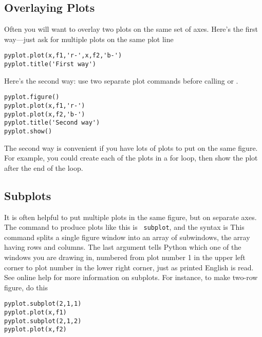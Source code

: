 \subsection*{Overlaying Plots}
  Often you will want to
overlay two plots on the same set of axes.
Here's the first way---just ask for multiple plots on the
same plot line
\begin{Verbatim}
pyplot.plot(x,f1,'r-',x,f2,'b-')
pyplot.title('First way')
\end{Verbatim}
Here's the second way: use two separate plot commands before calling  or .
\begin{Verbatim}
pyplot.figure()
pyplot.plot(x,f1,'r-')
pyplot.plot(x,f2,'b-')
pyplot.title('Second way')
pyplot.show()
\end{Verbatim}
The second way is convenient if you have lots of plots to put on
the same figure.  For example, you could create each of the plots in a for loop, then show the plot after the end of the loop.

\subsection*{Subplots}

It is often helpful to put multiple plots in the same figure, but
on separate axes. The command to produce plots like this is {\tt
subplot}, and the syntax is  This command splits a single figure window into an array
of subwindows, the array having  rows and 
columns. The last argument tells Python which one of the windows
you are drawing in, numbered from plot number 1 in the upper left
corner to plot number  in the lower right corner,
just as printed English is read. See online help for more
information on subplots.  For instance, to make two-row figure, do
this
\begin{Verbatim}
pyplot.subplot(2,1,1)
pyplot.plot(x,f1)
pyplot.subplot(2,1,2)
pyplot.plot(x,f2)
\end{Verbatim}



